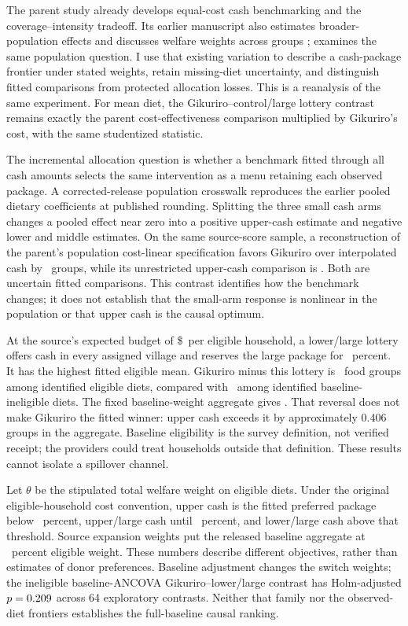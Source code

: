 \documentclass[11pt]{article}
\begin{document}
The parent study already develops equal-cost cash benchmarking and the coverage--intensity tradeoff. Its earlier manuscript also estimates broader-population effects and discusses welfare weights across groups \citep{mcintosh2020}; \citet{ozler2018} examines the same population question. I use that existing variation to describe a cash-package frontier under stated weights, retain missing-diet uncertainty, and distinguish fitted comparisons from protected allocation losses. This is a reanalysis of the same experiment. For mean diet, the Gikuriro--control/large lottery contrast remains exactly the parent cost-effectiveness comparison multiplied by Gikuriro's cost, with the same studentized statistic.

The incremental allocation question is whether a benchmark fitted through all cash amounts selects the same intervention as a menu retaining each observed package. A corrected-release population crosswalk reproduces the earlier pooled dietary coefficients at published rounding. Splitting the three small cash arms changes a pooled effect near zero into a positive upper-cash estimate and negative lower and middle estimates. On the same source-score sample, a reconstruction of the parent's population cost-linear specification favors Gikuriro over interpolated cash by \PopulationLinearGKDifference\ groups, while its unrestricted upper-cash comparison is \PopulationSourceGKUpper. Both are uncertain fitted comparisons. This contrast identifies how the benchmark changes; it does not establish that the small-arm response is nonlinear in the population or that upper cash is the causal optimum.

At the source's expected budget of \$\GikuriroCost\ per eligible household, a lower/large lottery offers cash in every assigned village and reserves the large package for \LowerLargeShare\ percent. It has the highest fitted eligible mean. Gikuriro minus this lottery is \CommunityEligibleLowerLarge\ food groups among identified eligible diets, compared with \CommunityIneligibleLowerLarge\ among identified baseline-ineligible diets. The fixed baseline-weight aggregate gives \CommunityAggregateLowerLarge. That reversal does not make Gikuriro the fitted winner: upper cash exceeds it by approximately 0.406 groups in the aggregate. Baseline eligibility is the survey definition, not verified receipt; the providers could treat households outside that definition. These results cannot isolate a spillover channel.

Let $\theta$ be the stipulated total welfare weight on eligible diets. Under the original eligible-household cost convention, upper cash is the fitted preferred package below \CommunityFirstSwitch\ percent, upper/large cash until \CommunitySecondSwitch\ percent, and lower/large cash above that threshold. Source expansion weights put the released baseline aggregate at \CommunityEligibleShare\ percent eligible weight. These numbers describe different objectives, rather than estimates of donor preferences. Baseline adjustment changes the switch weights; the ineligible baseline-ANCOVA Gikuriro--lower/large contrast has Holm-adjusted $p=0.209$ across 64 exploratory contrasts. Neither that family nor the observed-diet frontiers establishes the full-baseline causal ranking.
\end{document}
